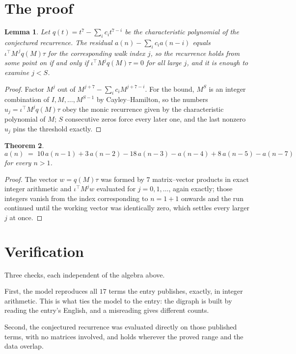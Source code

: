 \documentclass[11pt,a4paper]{article}
\theoremstyle{plain}
\newtheorem{theorem}{Theorem}
\newtheorem{lemma}[theorem]{Lemma}
\theoremstyle{definition}
\begin{document}
\section{The proof}

\begin{lemma}\label{lem:crit}
Let $q(t)=t^{7}-\sum_i c_it^{7-i}$ be the characteristic polynomial of the
conjectured recurrence. The residual $a(n)-\sum_ic_ia(n-i)$ equals
$\iota^{\!\top}M^{\,j}q(M)\tau$ for the corresponding walk index $j$, so the recurrence
holds from some point on if and only if $\iota^{\!\top}M^{j}q(M)\tau=0$ for all large $j$,
and it is enough to examine $j<S$.
\end{lemma}

\begin{proof}
Factor $M^{j}$ out of $M^{j+7}-\sum_ic_iM^{j+7-i}$. For the bound, $M^{S}$
is an integer combination of $I,M,\dots,M^{S-1}$ by Cayley--Hamilton, so the numbers
$u_j=\iota^{\!\top}M^{j}q(M)\tau$ obey the monic recurrence given by the characteristic
polynomial of $M$; $S$ consecutive zeros force every later one, and the last nonzero $u_j$
pins the threshold exactly.
\end{proof}

\begin{theorem}
\[
a(n)\;=\;10\,a(n-1) + 3\,a(n-2) - 18\,a(n-3) - a(n-4) + 8\,a(n-5) - a(n-7)
\]
for every $n>1$.
\end{theorem}

\begin{proof}
The vector $w=q(M)\tau$ was formed by $7$ matrix--vector products in exact integer
arithmetic and $\iota^{\!\top}M^{j}w$ evaluated for $j=0,1,\dots$, again exactly; those
integers vanish from the index corresponding to $n=1+1$ onwards and the run continued
until the working vector was identically zero, which settles every larger $j$ at once.
\end{proof}

\section{Verification}

Three checks, each independent of the algebra above.

First, the model reproduces all $17$ terms the entry publishes, exactly, in integer
arithmetic. This is what ties the model to the entry: the digraph is built by reading the
entry's English, and a misreading gives different counts.

Second, the conjectured recurrence was evaluated directly on those published terms, with no
matrices involved, and holds wherever the proved range and the data overlap.
\end{document}
